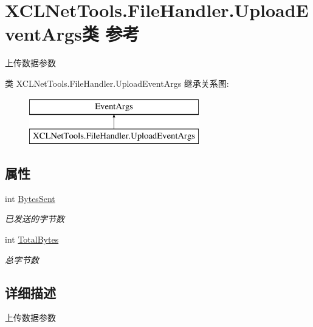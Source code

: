 \hypertarget{class_x_c_l_net_tools_1_1_file_handler_1_1_upload_event_args}{}\section{X\+C\+L\+Net\+Tools.\+File\+Handler.\+Upload\+Event\+Args类 参考}
\label{class_x_c_l_net_tools_1_1_file_handler_1_1_upload_event_args}


上传数据参数  


类 X\+C\+L\+Net\+Tools.\+File\+Handler.\+Upload\+Event\+Args 继承关系图\+:\begin{figure}[H]
\begin{center}
\leavevmode
\includegraphics[height=2.000000cm]{class_x_c_l_net_tools_1_1_file_handler_1_1_upload_event_args}
\end{center}
\end{figure}
\subsection*{属性}
\begin{DoxyCompactItemize}
\item 
int \hyperlink{class_x_c_l_net_tools_1_1_file_handler_1_1_upload_event_args_aeb753c87413d86d610121060635794e1}{Bytes\+Sent}
\begin{DoxyCompactList}\small\item\em 已发送的字节数 \end{DoxyCompactList}\item 
int \hyperlink{class_x_c_l_net_tools_1_1_file_handler_1_1_upload_event_args_a874a8bc16016a3d11eb9aa52f9670eb4}{Total\+Bytes}
\begin{DoxyCompactList}\small\item\em 总字节数 \end{DoxyCompactList}\end{DoxyCompactItemize}


\subsection{详细描述}
上传数据参数 



